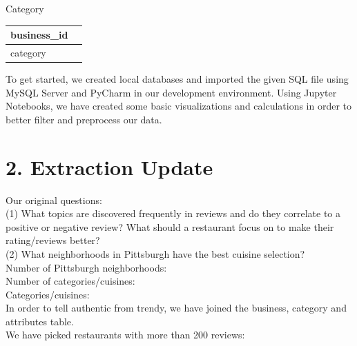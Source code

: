 \documentclass{neu_handout}
\begin{document}
\begin{center}
Category\\
\begin{tabular}{|l|l|}
\hline
business\_id  \\ \hline
category  \\ \hline
\end{tabular}
\end{center}


To get started, we created local databases and imported the given SQL file using MySQL Server and PyCharm in our development environment. Using Jupyter Notebooks, we have created some basic visualizations and calculations in order to better filter and preprocess our data.

\section*{2. Extraction Update}
Our original questions: \\
(1) What topics are discovered frequently in reviews and do they correlate to a positive or negative review? What should a restaurant focus on to make their rating/reviews better? \\
(2) What neighborhoods in Pittsburgh have the best cuisine selection? \\

Number of Pittsburgh neighborhoods: \\
Number of categories/cuisines: \\
Categories/cuisines: \\

In order to tell authentic from trendy, we have joined the business, category and attributes table.\\


We have picked restaurants with more than 200 reviews:
\end{document}
